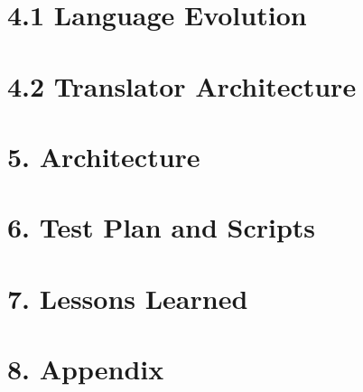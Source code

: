 \documentclass[11pt]{article}
\begin{document}
\section*{4.1 Language Evolution}

\newpage

\section*{4.2 Translator Architecture}

\newpage

\section*{5. Architecture}

\newpage

\section*{6. Test Plan and Scripts}

\newpage

\section*{7. Lessons Learned}

\newpage

\section*{8. Appendix}

\newpage
\end{document}
